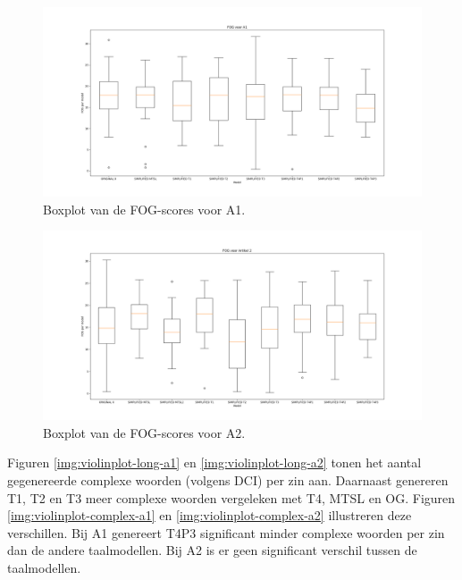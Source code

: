 \begin{figure}[H]
	\includegraphics[width=\linewidth]{img/boxplot-fog-a1.png}
	\caption{Boxplot van de FOG-scores voor A1.}
	\label{img:boxplot-fog-a1}
\end{figure}

\begin{figure}[H]
	\includegraphics[width=\linewidth]{img/boxplot-fog-a2.png}
	\caption{Boxplot van de FOG-scores voor A2.}
	\label{img:boxplot-fog-a2}
\end{figure}

Figuren \ref{img:violinplot-long-a1} en \ref{img:violinplot-long-a2} tonen het aantal gegenereerde complexe woorden (volgens DCI) per zin aan. Daarnaast genereren T1, T2 en T3 meer complexe woorden vergeleken met T4, MTSL en OG. Figuren \ref{img:violinplot-complex-a1} en \ref{img:violinplot-complex-a2} illustreren deze verschillen. Bij A1 genereert T4P3 significant minder complexe woorden per zin dan de andere taalmodellen. Bij A2 is er geen significant verschil tussen de taalmodellen.

